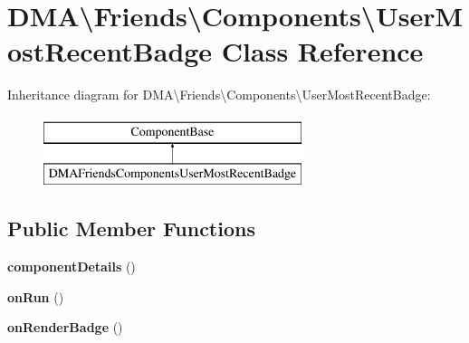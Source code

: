 \hypertarget{classDMA_1_1Friends_1_1Components_1_1UserMostRecentBadge}{\section{D\+M\+A\textbackslash{}Friends\textbackslash{}Components\textbackslash{}User\+Most\+Recent\+Badge Class Reference}
\label{classDMA_1_1Friends_1_1Components_1_1UserMostRecentBadge}
}
Inheritance diagram for D\+M\+A\textbackslash{}Friends\textbackslash{}Components\textbackslash{}User\+Most\+Recent\+Badge\+:\begin{figure}[H]
\begin{center}
\leavevmode
\includegraphics[height=2.000000cm]{d7/d5f/classDMA_1_1Friends_1_1Components_1_1UserMostRecentBadge}
\end{center}
\end{figure}
\subsection*{Public Member Functions}
\begin{DoxyCompactItemize}
\item 
\hypertarget{classDMA_1_1Friends_1_1Components_1_1UserMostRecentBadge_af1a08876aa0dd5462363a71e4624e085}{{\bfseries component\+Details} ()}\label{classDMA_1_1Friends_1_1Components_1_1UserMostRecentBadge_af1a08876aa0dd5462363a71e4624e085}

\item 
\hypertarget{classDMA_1_1Friends_1_1Components_1_1UserMostRecentBadge_a8344e51d141173d907bf02bddec92635}{{\bfseries on\+Run} ()}\label{classDMA_1_1Friends_1_1Components_1_1UserMostRecentBadge_a8344e51d141173d907bf02bddec92635}

\item 
\hypertarget{classDMA_1_1Friends_1_1Components_1_1UserMostRecentBadge_a3a27b3649a629bf7b018d3f6e4513053}{{\bfseries on\+Render\+Badge} ()}\label{classDMA_1_1Friends_1_1Components_1_1UserMostRecentBadge_a3a27b3649a629bf7b018d3f6e4513053}

\end{DoxyCompactItemize}

